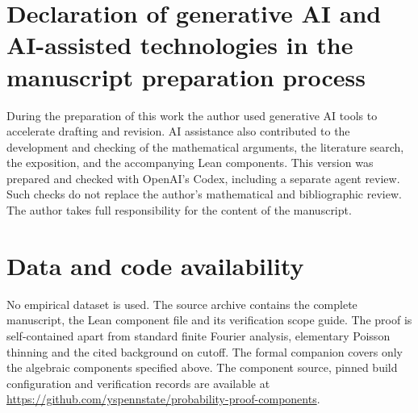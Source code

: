 \documentclass[11pt]{article}
\theoremstyle{remark}\newtheorem{remark}[theorem]{Remark}
\begin{document}
\section*{Declaration of generative AI and AI-assisted technologies in the manuscript preparation process}
During the preparation of this work the author used generative AI tools to accelerate drafting and revision. AI assistance also contributed to the development and checking of the mathematical arguments, the literature search, the exposition, and the accompanying Lean components. This version was prepared and checked with OpenAI's Codex, including a separate agent review. Such checks do not replace the author's mathematical and bibliographic review. The author takes full responsibility for the content of the manuscript.

\section*{Data and code availability}
No empirical dataset is used. The source archive contains the complete manuscript, the Lean component file and its verification scope guide. The proof is self-contained apart from standard finite Fourier analysis, elementary Poisson thinning and the cited background on cutoff. The formal companion covers only the algebraic components specified above. The component source, pinned build configuration and verification records are available at \url{https://github.com/yspennstate/probability-proof-components}.
\end{document}
